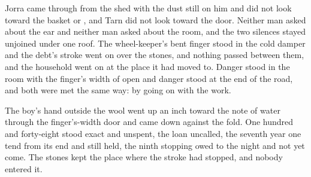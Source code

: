 Jorra came through from the shed with the dust still on him and did not look toward the basket or , and Tarn did not look toward the door. Neither man asked about the ear and neither man asked about the room, and the two silences stayed unjoined under one roof. The wheel-keeper's bent finger stood in the cold damper and the debt's stroke went on over the stones, and nothing passed between them, and the household went on at the place it had moved to. Danger stood in the room with the finger's width of open and danger stood at the end of the road, and both were met the same way: by going on with the work.

The boy's hand outside the wool went up an inch toward the note of water through the finger's-width door and came down against the fold. One hundred and forty-eight stood exact and unspent, the loan uncalled, the seventh year one tend from its end and still held, the ninth stopping owed to the night and not yet come. The stones kept the place where the stroke had stopped, and nobody entered it.
